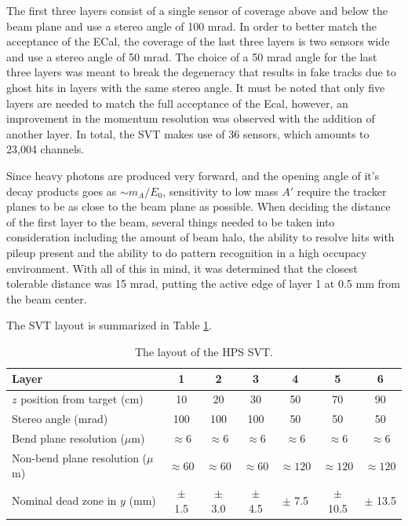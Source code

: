 The first three layers consist of a single sensor of coverage above and below
the beam plane and use a stereo angle of 100 mrad. In order to better match the
acceptance of the ECal, the coverage of the last three layers is two sensors 
wide and use a stereo angle of 50 mrad.  The choice of a 50 mrad angle for the
last three layers was meant to break the degeneracy that results in fake tracks
due to ghost hits in layers with the same stereo angle.  It must be noted that
only five layers are needed to match the full acceptance of the Ecal, however,
an improvement in the momentum resolution was observed with the addition of 
another layer.  In total, the SVT makes use of 36 sensors, which amounts to 
23,004 channels.

Since heavy photons are produced very forward, and the opening angle of it's 
decay products goes as $\sim m_{A}/E_{0}$, sensitivity to low mass $A'$ require
the tracker planes to be as close to the beam plane as possible.  When deciding
the distance of the first layer to the beam, several things  needed to be taken
into consideration including the amount of beam halo, the ability to resolve 
hits with pileup present and the ability to do pattern recognition in a high 
occupacy environment.  With all of this in mind, it was determined that the 
closest tolerable distance was 15 mrad, putting the active edge of layer 1 
at 0.5 mm from the beam center.  

The SVT layout is summarized in Table \ref{tab:svt_layout}.

\begin{table}[t]
 \begin{center}
\begin{tabular}{l|cccccc}  
\hline
Layer & 1 & 2 & 3 & 4 & 5 & 6 \\ \hline
$z$ position from target (cm)    & 10 & 20 & 30 & 50 & 70 & 90 \\
Stereo angle (mrad) & 100 & 100 & 100 & 50 & 50 & 50 \\
Bend plane resolution ($\mu$m) & $\approx$6 & $\approx$6 & $\approx$6 & $\approx$6 & $\approx$6 & $\approx$6 \\
Non-bend plane resolution ($\mu$m) & $\approx60$ & $\approx60$ & $\approx60$ & $\approx120$ & $\approx120$ & $\approx120$ \\
Nominal dead zone in $y$ (mm) & $\pm$ 1.5 & $\pm$ 3.0 & $\pm$ 4.5 & $\pm$ 7.5 & $\pm$ 10.5 & $\pm$ 13.5 \\ 
\hline
\end{tabular}
\caption{The layout of the HPS SVT.}
\label{tab:svt_layout}
\end{center}
\end{table}

